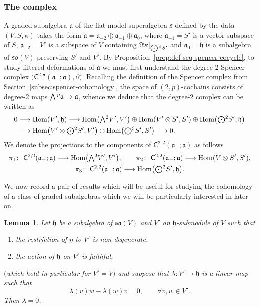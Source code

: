 \documentclass[10pt,a4paper]{amsart}
\numberwithin{equation}{section}
\newtheorem{Lemma}[Theorem]{Lemma}
\newcommand{\fa}{\mathfrak{a}}
\newcommand{\fh}{\mathfrak{h}}
\newcommand{\fs}{\mathfrak{s}}
\newcommand{\fso}{\mathfrak{so}}
\newcommand{\ssC}{\mathsf{C}}
\newcommand{\Wedge}{\mathchoice{{\textstyle\bigwedge}}{\bigwedge}{\bigwedge}{\bigwedge}}	%
\newcommand{\Odot}{\mathchoice{{\textstyle\bigodot}}{\bigodot}{\bigodot}{\bigodot}}
\newcommand{\1}{\mathbbm{1}}
\DeclareMathOperator{\Hom}{Hom}
\begin{document}
\subsubsection{The complex}

A graded subalgebra $\fa$ of the flat model superalgebra $\fs$ defined by the data $(V,S,\kappa)$ takes the form $\fa=\fa_{-2}\oplus\fa_{-1}\oplus\fa_0$, where $\fa_{-1}=S'$ is a vector subspace of $S$, $\fa_{-2}=V'$ is a subspace of $V$ containing $\Im \kappa|_{\Odot^2S'}$ and $\fa_0=\fh$ is a subalgebra of $\fso(V)$ preserving $S'$ and $V'$. By Proposition~\ref{prop:def-seq-spencer-cocycle}, to study filtered deformations of $\fa$ we must first understand the degree-2 Spencer complex $\bigl(\ssC^{2,\bullet}(\fa_-;\fa),\partial\bigr)$. Recalling the definition of the Spencer complex from Section~\ref{subsec:spencer-cohomology}, the space of $(2,p)$-cochains consists of degree-2 maps $\Wedge^p\fa\to\fa$, whence we deduce that the degree-2 complex can be written as
\begin{align*}
	0 &\longrightarrow \Hom(V',\fh)
\longrightarrow \Hom\bigl(\Wedge^2V',V'\bigr)\oplus\Hom(V'\otimes S',S')\oplus\Hom\bigl(\Odot^2S',\fh\bigr)\\
	&\longrightarrow \Hom\bigl(V'\otimes\Odot^2S',V'\bigr)\oplus\Hom\bigl(\Odot^3S',S'\bigr)\longrightarrow 0.
\end{align*}
We denote the projections to the components of $\ssC^{2,2}(\fa_-;\fa)$ as follows
\begin{gather*}
	\pi_1\colon\ \ssC^{2,2}(\fa_-;\fa) \longrightarrow \Hom\bigl(\Wedge^2V',V'\bigr),\qquad
	\pi_2\colon\ \ssC^{2,2}(\fa_-;\fa) \longrightarrow \Hom(V\otimes S',S'),\\
	\pi_3\colon\ \ssC^{2,2}(\fa_-;\fa) \longrightarrow \Hom\bigl(\Odot^2S',\fh\bigr).
\end{gather*}

We now record a pair of results which will be useful for studying the cohomology of a class of graded subalgebras which we will be particularly interested in later on.

\begin{Lemma}\label{lemma:V-h-maps}
	Let $\fh$ be a subalgebra of $\fso(V)$ and $V'$ an $\fh$-submodule of $V$ such that
	\begin{enumerate}\itemsep=0pt
		\item[$(1)$] the restriction of $\eta$ to $V'$ is non-degenerate,
		\item[$(2)$] the action of $\fh$ on $V'$ is faithful,
	\end{enumerate}
	$($which hold in particular for $V'=V)$ and suppose that $\lambda\colon V'\to\fh$ is a linear map such that
	\[%
		\lambda(v)w - \lambda(w)v = 0, \qquad \forall v,w\in V'.
	\]
	Then $\lambda=0$.
\end{Lemma}
\end{document}
